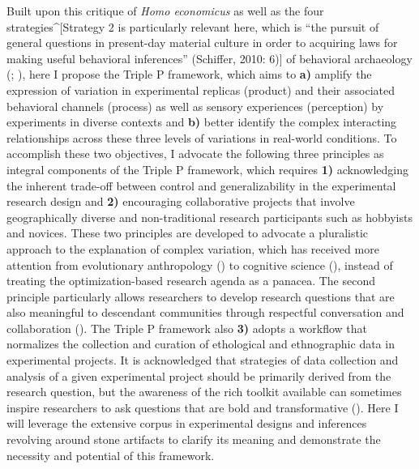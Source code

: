 \documentclass[
  11pt,
  letterpaper,
  DIV=11,
  numbers=noendperiod]{scrartcl}
\begin{document}
Built upon this critique of \emph{Homo economicus} as well as the four
strategies\^{}{[}Strategy 2 is particularly relevant here, which is
``the pursuit of general questions in present-day material culture in
order to acquiring laws for making useful behavioral inferences''
(Schiffer, 2010: 6){]} of behavioral archaeology
(;
), here I propose the Triple
P framework, which aims to \textbf{a)} amplify the expression of
variation in experimental replicas (product) and their associated
behavioral channels (process) as well as sensory experiences
(perception) by experiments in diverse contexts and \textbf{b)} better
identify the complex interacting relationships across these three levels
of variations in real-world conditions. To accomplish these two
objectives, I advocate the following three principles as integral
components of the Triple P framework, which requires \textbf{1)}
acknowledging the inherent trade-off between control and
generalizability in the experimental research design and \textbf{2)}
encouraging collaborative projects that involve geographically diverse
and non-traditional research participants such as hobbyists and novices.
These two principles are developed to advocate a pluralistic approach to
the explanation of complex variation, which has received more attention
from evolutionary anthropology () to cognitive science (), instead of treating the optimization-based research agenda as a
panacea. The second principle particularly allows researchers to develop
research questions that are also meaningful to descendant communities
through respectful conversation and collaboration
(). The Triple P
framework also \textbf{3)} adopts a workflow that normalizes the
collection and curation of ethological and ethnographic data in
experimental projects. It is acknowledged that strategies of data
collection and analysis of a given experimental project should be
primarily derived from the research question, but the awareness of the
rich toolkit available can sometimes inspire researchers to ask
questions that are bold and transformative
(). Here I
will leverage the extensive corpus in experimental designs and
inferences revolving around stone artifacts to clarify its meaning and
demonstrate the necessity and potential of this framework.
\end{document}
